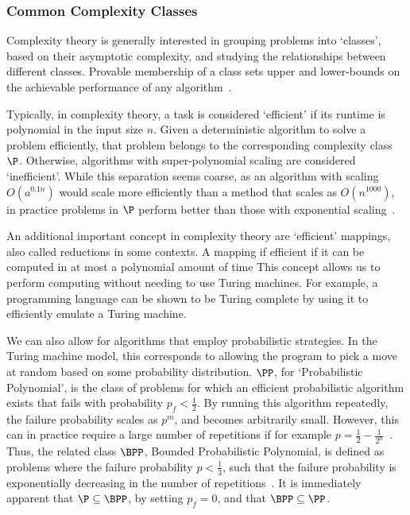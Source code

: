 \subsubsection{Common Complexity Classes}
Complexity theory is generally interested in grouping problems into `classes', based on their asymptotic complexity, and studying the relationships between different classes. Provable membership of a class sets upper and lower-bounds on the achievable performance of any algorithm~\cite{Nielsen2000}.\par
Typically, in complexity theory, a task is considered `efficient' if its runtime is polynomial in the input size $n$. Given a deterministic algorithm to solve a problem efficiently, that problem belongs to the corresponding complexity class $\P$. Otherwise, algorithms with super-polynomial  scaling are considered `inefficient'. While this separation seems coarse, as an algorithm with scaling $O\left(a^{0.1n}\right)$ would scale more efficiently than a method that scales as $O(n^{1000})$, in practice problems in $\P$ perform better than those with exponential scaling~\cite{Nielsen2000}.\par
An additional important concept in complexity theory are `efficient' mappings, also called reductions in some contexts. A mapping if efficient if it can be computed in at most a polynomial amount of time This concept allows us to perform computing without needing to use Turing machines. For example, a programming language can be shown to be Turing complete by using it to efficiently emulate a Turing machine.\par
We can also allow for algorithms that employ probabilistic strategies. In the Turing machine model, this corresponds to allowing the program to pick a move at random based on some probability distribution. $\PP$, for `Probabilistic Polynomial', is the class of problems for which an efficient probabilistic algorithm exists that fails with probability $p_{f}<\frac{1}{2}$. By running this algorithm repeatedly, the failure probability scales as $p^{m}$, and becomes arbitrarily small. However, this can in practice require a large number of repetitions if for example $p=\frac{1}{2}-\frac{1}{2^{n}}$~\cite{Aaronson2004c}. Thus, the related class $\BPP$, Bounded Probabilistic Polynomial, is defined as problems where the failure probability $p < \frac{1}{3}$, such that the failure probability is exponentially decreasing in the number of repetitions~\cite{Nielsen2000}. It is immediately apparent that $\P\subseteq \BPP$, by setting $p_{f}=0$, and that $\BPP\subseteq \PP$.\par
